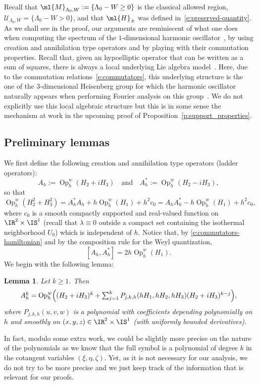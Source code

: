 \documentclass[JEP,XML,SOM,Unicode, NoEqCountersInSection,published]{cedram}
\theoremstyle{plain}
\newtheorem{lemm}[theo]{Lemma}
\theoremstyle{definition}
\theoremstyle{remark}
\newcommand{\Op}{\operatorname{Op}}
\begin{document}
Recall that $\ml{M}_{\Lambda_0,W}:=\{\Lambda_0-W\geq 0\}$ is the classical allowed region, $\mathcal{U}_{\Lambda_0,W} = \{ \Lambda_0 - W > 0 \}$, and that $\ml{H}_{\pm}$ was defined in~\eqref{e:preserved-quantity}. As we shall see in the proof, our arguments are reminiscent of what one does when computing the spectrum of the $1$\nobreakdash-dimensional harmonic oscillator~\cite[Ch.\,6]{Zworski12}, \ie by using creation and annihilation type operators and by playing with their commutation properties. Recall that, given an hypoelliptic operator that can be written as a sum of squares, there is \hbox{always} a local underlying Lie algebra model~\cite{RothschildStein76}. Here, due to the commutation rela\-tions~\eqref{e:commutators}, this underlying structure is the one of the $3$-dimensional Heisenberg group for which the harmonic oscillator naturally appears when performing Fourier analysis on this group~\cite{FermanianFischer21}. We do not explicitly use this local algebraic structure but this is in some sense the mechanism at work in the upcoming proof of Proposition~\ref{p:support_properties}.

\subsection{Preliminary lemmas}
\label{s:preliminary_section}

We first define the following creation and annihilation type operators (ladder operators):
\[
A_h:=\Op_h^w(H_2+iH_3)\quad\text{and}\quad A_h^*:=\Op_h^w(H_2-iH_3),
\]
so that
\begin{equation}\label{e:AAstar}
\Op_h^w(H_2^2+H_3^2)=A_h^*A_h+h\Op_h^w(H_1)+h^2c_0=A_hA_h^*-h\Op_h^w(H_1)+h^2c_0,
\end{equation}
where $c_0$ is a smooth compactly supported and real-valued function on $\IR^2\times\IS^1$ (recall that $\lambda\equiv 0$ outside a compact set containing the isothermal neighborhood $U_0$) which is independent of $h$. Notice that, by \eqref{e:commutators-hamiltonian} and by the composition rule for the Weyl quantization,
\begin{equation}
\label{e:commutator_A_A*}
[A_h, A_h^*] = 2h \Op_h^w(H_1).
\end{equation}
We begin with the following lemma:

\begin{lemm}\label{l:A:power-k} Let $k\geq 1$. Then
\[\textstyle
A_h^k=\Op_h^w\Bigl((H_2+iH_3)^k+\sum_{j=1}^{k}P_{j,k,h}(hH_1,hH_2,hH_3)(H_2+iH_3)^{k-j}\Bigr),
\]
where $P_{j,k,h}(u,v,w)$ is a polynomial with coefficients depending polynomially on $h$ and smoothly on $(x,y,z)\in\IR^2\times\IS^1$ (with uniformly bounded derivatives).
\end{lemm}
In fact, modulo some extra work, we could be slightly more precise on the nature of the polynomials as we know that the full symbol is a polynomial of degree $k$ in the cotangent variables $(\xi,\eta,\zeta)$. Yet, as it is not necessary for our analysis, we do not try to be more precise and we just keep track of the information that is relevant for our proofs.
\end{document}
